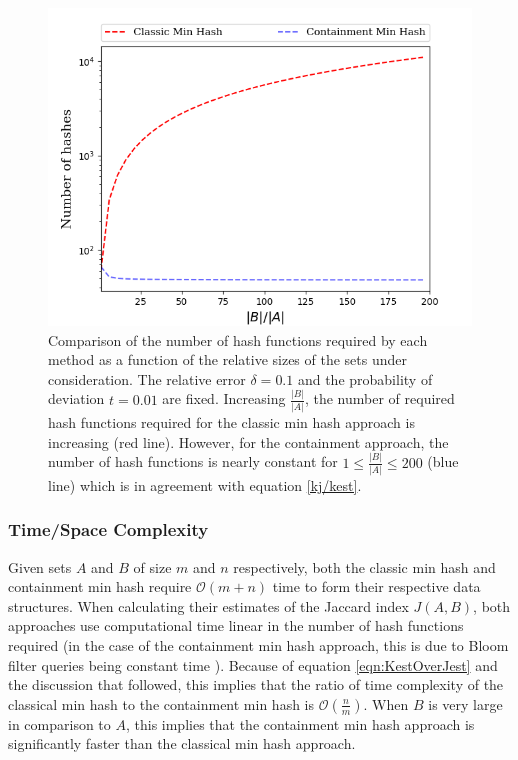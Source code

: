 \documentclass[11pt,reqno]{amsart}
\theoremstyle{remark}
\numberwithin{equation}{section}
\begin{document}
\begin{figure}[!h]%
\begin{center}
\includegraphics[width=0.75\linewidth,trim={0 0 0 0in},clip]{Figs/increasingRatioWithCont2.png}
\end{center}
\caption{Comparison of the number of hash functions required by each method as a function of the relative sizes of the sets under consideration. The relative error $\delta=0.1$ and the probability of deviation $t=0.01$ are fixed. Increasing $\frac{|B|}{|A|}$, the number of required hash functions required for the classic min hash approach is increasing (red line). However, for the containment approach, the number of hash functions is nearly constant for $1\leq\frac{|B|}{|A|}\leq 200$ (blue line) which is in agreement with equation \ref{kj/kest}.}
\label{Kratio}%
\end{figure}


\subsubsection{Time/Space Complexity}
Given sets $A$ and $B$ of size $m$ and $n$ respectively, both the classic min hash and containment min hash require $\mathcal{O}(m+n)$ time to form their respective data structures. When calculating their estimates of the Jaccard index $J(A,B)$, both approaches use computational time linear in the number of hash functions required (in the case of the containment min hash approach, this is due to Bloom filter queries being constant time \cite{bloom1970space}). Because of equation \eqref{eqn:KestOverJest} and the discussion that followed, this implies that the ratio of time complexity of the classical min hash to the containment min hash is $\mathcal{O}(\frac{n}{m})$. When $B$ is very large in comparison to $A$, this implies that the containment min hash approach is significantly faster than the classical min hash approach.
\end{document}
